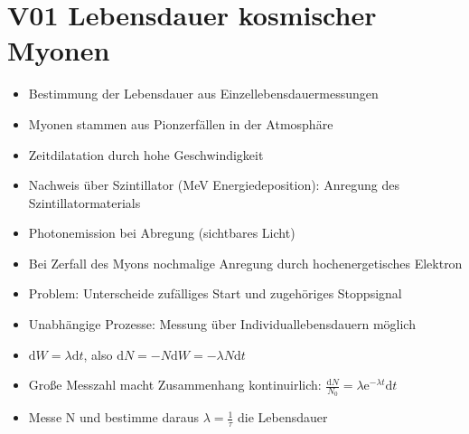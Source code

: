 \section{V01 Lebensdauer kosmischer Myonen}
\label{sec:myonen}

\begin{itemize}
    \item Bestimmung der Lebensdauer aus Einzellebensdauermessungen
    \item Myonen stammen aus Pionzerfällen in der Atmosphäre
    \item Zeitdilatation durch hohe Geschwindigkeit
    \item Nachweis über Szintillator (MeV Energiedeposition): Anregung des Szintillatormaterials
    \item Photonemission bei Abregung (sichtbares Licht)
    \item Bei Zerfall des Myons nochmalige Anregung durch hochenergetisches Elektron
    \item Problem: Unterscheide zufälliges Start und zugehöriges Stoppsignal
    \item Unabhängige Prozesse: Messung über Individuallebensdauern möglich
    \item $\text{d}W = \lambda\text{d}t$, also $\text{d}N = -N\text{d}W = -\lambda N\text{d}t$
    \item Große Messzahl macht Zusammenhang kontinuirlich: $\frac{\text{d}N}{N_0} = \lambda\text{e}^{-\lambda t}\text{d}t$
    \item Messe N und bestimme daraus $\lambda = \frac{1}{\tau}$ die Lebensdauer
\end{itemize}

